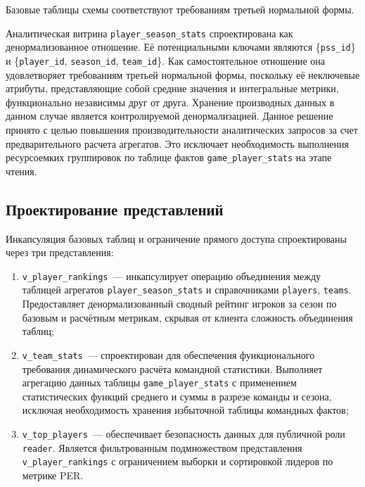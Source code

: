 Базовые таблицы схемы соответствуют требованиям третьей нормальной формы.

Аналитическая витрина \texttt{player\_season\_stats} спроектирована как денормализованное отношение. Её потенциальными ключами являются \{\texttt{pss\_id}\} и \{\texttt{player\_id}, \texttt{season\_id}, \texttt{team\_id}\}. Как самостоятельное отношение она удовлетворяет требованиям третьей нормальной формы, поскольку её неключевые атрибуты, представляющие собой средние значения и интегральные метрики, функционально независимы друг от друга. Хранение производных данных в данном случае является контролируемой денормализацией. Данное решение принято с целью повышения производительности аналитических запросов за счет предварительного расчета агрегатов. Это исключает необходимость выполнения ресурсоемких группировок по таблице фактов \texttt{game\_player\_stats} на этапе чтения.
\subsection{Проектирование представлений}

Инкапсуляция базовых таблиц и ограничение прямого доступа спроектированы
через три представления:
\begin{enumerate}
    \item \texttt{v\_player\_rankings}~--- инкапсулирует операцию объединения между
          таблицей агрегатов \texttt{player\_season\_stats} и справочниками
          \texttt{players}, \texttt{teams}. Предоставляет денормализованный
          сводный рейтинг игроков за сезон по базовым и расчётным метрикам,
          скрывая от клиента сложность объединения таблиц;
    \item \texttt{v\_team\_stats}~--- спроектирован для обеспечения функционального требования
          динамического расчёта командной статистики. Выполняет агрегацию
          данных таблицы \newline \texttt{game\_player\_stats} с применением
          статистических функций среднего и суммы в разрезе команды
          и сезона, исключая необходимость хранения избыточной таблицы
          командных фактов;
    \item \texttt{v\_top\_players}~--- обеспечивает безопасность данных для
          публичной роли \texttt{reader}. Является фильтрованным подмножеством
          представления \texttt{v\_player\_rankings} с ограничением выборки
          и сортировкой лидеров по метрике PER.
\end{enumerate}

